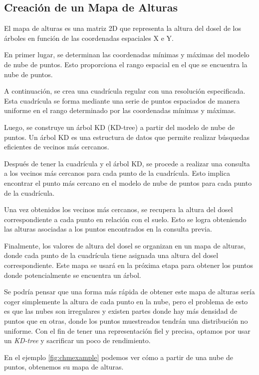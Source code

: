 \subsection{Creación de un Mapa de Alturas}
El mapa de alturas es una matriz 2D que representa la altura del dosel de los árboles en función de las coordenadas espaciales X e Y.

En primer lugar, se determinan las coordenadas mínimas y máximas del modelo de nube de puntos. Esto proporciona el rango espacial en el que se encuentra la nube de puntos.

A continuación, se crea una cuadrícula regular con una resolución especificada. Esta cuadrícula se forma mediante una serie de puntos espaciados de manera uniforme en el rango determinado por las coordenadas mínimas y máximas.

Luego, se construye un árbol KD (KD-tree) a partir del modelo de nube de puntos. Un árbol KD es una estructura de datos que permite realizar búsquedas eficientes de vecinos más cercanos.

Después de tener la cuadrícula y el árbol KD, se procede a realizar una consulta a los vecinos más cercanos para cada punto de la cuadrícula. Esto implica encontrar el punto más cercano en el modelo de nube de puntos para cada punto de la cuadrícula.

Una vez obtenidos los vecinos más cercanos, se recupera la altura del dosel correspondiente a cada punto en relación con el suelo. Esto se logra obteniendo las alturas asociadas a los puntos encontrados en la consulta previa.

Finalmente, los valores de altura del dosel se organizan en un mapa de alturas, donde cada punto de la cuadrícula tiene asignada una altura del dosel correspondiente. Este mapa se usará en la próxima etapa para obtener los puntos donde potencialmente se encuentra un árbol.

Se podría pensar que una forma más rápida de obtener este mapa de alturas sería coger simplemente la altura de cada punto en la nube, pero el problema de esto es que las nubes son irregulares y existen partes donde hay más densidad de puntos que en otras, donde los puntos muestreados tendrán una distribución no uniforme. Con el fin de tener una representación fiel y precisa, optamos por usar un \textit{KD-tree} y sacrificar un poco de rendimiento.

En el ejemplo \ref{fig:chmexample} podemos ver cómo a partir de una nube de puntos, obtenemos su mapa de alturas.

